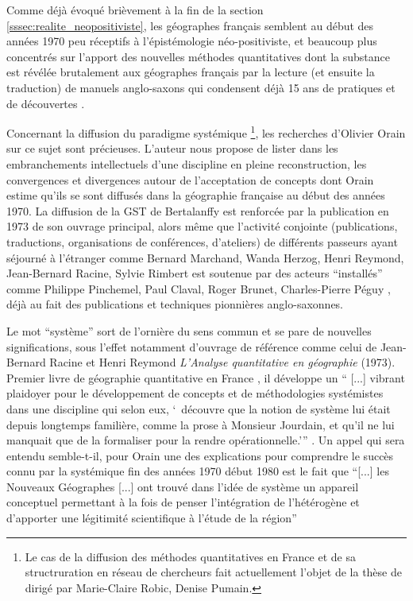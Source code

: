 
Comme déjà évoqué brièvement à la fin de la section \ref{sssec:realite_neopositiviste}, les géographes français semblent au début des années 1970 peu réceptifs à l'épistémologie néo-positiviste, et beaucoup plus concentrés sur l'apport des nouvelles méthodes quantitatives dont la substance est révélée brutalement aux géographes français par la lecture (et ensuite la traduction) de manuels anglo-saxons qui condensent déjà 15 ans de pratiques et de découvertes \autocite[129]{Pumain2002}.

Concernant la diffusion du paradigme systémique \footnote{Le cas de la diffusion des méthodes quantitatives en France et de sa structruration en réseau de chercheurs fait actuellement l'objet de la thèse de \textcite{Cuyala2014} dirigé par Marie-Claire Robic, Denise Pumain.}, les recherches d'Olivier Orain \autocite{Orain2001} sur ce sujet sont précieuses. L'auteur nous propose de lister dans les embranchements intellectuels d'une discipline en pleine reconstruction, les convergences et divergences autour de l'acceptation de concepts dont Orain estime qu'ils se sont diffusés dans la géographie française au début des années 1970. La diffusion de la GST de Bertalanffy est renforcée par la publication en 1973 de son ouvrage principal, alors même que l'activité conjointe (publications, traductions, organisations de conférences, d'ateliers) de différents passeurs ayant séjourné à l'étranger comme Bernard Marchand, Wanda Herzog, Henri Reymond, Jean-Bernard Racine, Sylvie Rimbert est soutenue par des acteurs \enquote{installés} comme Philippe Pinchemel, Paul Claval, Roger Brunet, Charles-Pierre Péguy \autocite{Pumain2002,Cauvin2007}, déjà au fait des publications et techniques pionnières anglo-saxonnes.


Le mot \enquote{système} sort de l'ornière du sens commun et se pare de nouvelles significations, sous l'effet notamment d'ouvrage de référence comme celui de Jean-Bernard Racine et Henri Reymond  \textit{L’Analyse quantitative en géographie} (1973). Premier livre de géographie quantitative en France \autocite{Cauvin2007}, il développe un \enquote{ [...] vibrant plaidoyer pour le développement de concepts et de méthodologies systémistes dans une discipline qui selon eux, \enquote{ découvre que la notion de système lui était depuis longtemps familière, comme la prose à Monsieur Jourdain, et qu'il ne lui manquait que de la formaliser pour la rendre opérationnelle.}} \textcite{Orain2001}. Un appel qui sera entendu semble-t-il, pour Orain \autocite[23]{Orain2001} une des explications pour comprendre le succès connu par la systémique fin des années 1970 début 1980 est le fait que \enquote{[...] les Nouveaux Géographes [...] ont trouvé dans l’idée de système un appareil conceptuel permettant à la fois de penser l’intégration de l’hétérogène et d’apporter une légitimité scientifique à l’étude de la région}

